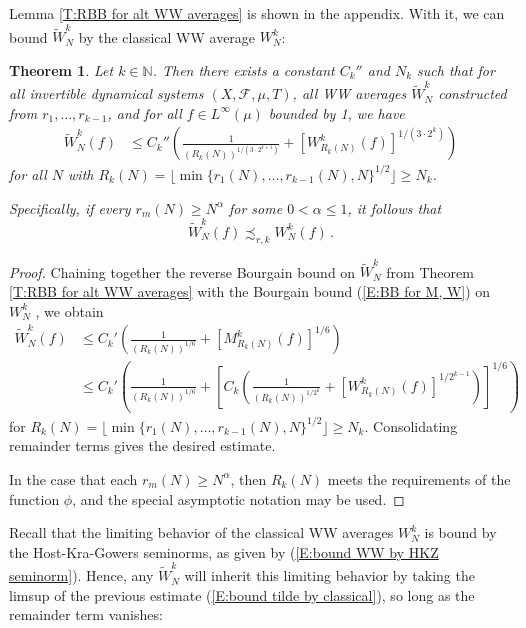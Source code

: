 \documentclass[11pt, oneside]{amsart}   	%
\newcommand{\1}{\mathbbm{1}}
\newcommand{\N}{\mathbb{N}}
\newcommand{\floor}[1]{\lfloor#1\rfloor}
\newtheorem{theorem}{Theorem}[section]
\theoremstyle{definition}
\begin{document}
Lemma \ref{T:RBB for alt WW averages} is shown in the appendix. With it, we can bound $\widetilde W_{N}^k$ by the classical WW average $W_N^k$:

\begin{theorem}\label{T:bound tilde by classical}
Let $k\in \N$. Then there exists a constant $C_k''$ and $N_k$ such that for all invertible dynamical systems $(X, \mathcal{F},\mu, T)$, all WW averages $\widetilde W_N^k$ constructed from $r_1, \dots, r_{k-1}$, and for all $f\in L^\infty(\mu)$ bounded by 1, we have
\begin{align}\label{E:bound tilde by classical}
\widetilde W_N^k(f) &\leq C_k'' \left( \frac{1}{(R_k(N))^{1/(3\cdot 2^{k+1})}} + \left[W_{R_k(N)}^k (f)\right]^{1/(3\cdot 2^{k})} \right)
\end{align}
for all $N$ with $R_k(N) = \floor{\min\{r_1(N), \dots, r_{k-1}(N), N\}^{1/2}} \geq N_k$.

Specifically, if every $r_m(N) \geq N^\alpha$ for some $0< \alpha \leq 1$, it follows that
$$\widetilde{W}_N^k(f) \precsim_{r, k} W_N^k(f)\, .$$
\end{theorem}
\begin{proof}
Chaining together the reverse Bourgain bound on $\widetilde W_N^k$ from Theorem \ref{T:RBB for alt WW averages} with the Bourgain bound (\ref{E:BB for M, W}) on $W_N^k$ , we obtain
\begin{align*}
\widetilde W_N^k(f) &\leq C_k'\left( \frac{1}{(R_k(N))^{1/6}} + \left[ M_{R_k(N)}^k (f)\right]^{1/6}\right) \\
&\leq C_k'\left( \frac{1}{(R_k(N))^{1/6}} + \left[  C_{k} \left( \frac{1}{(R_k(N))^{1/2^k}} + \left[W_{R_k(N)}^k (f)\right]^{1/2^{k-1}} \right)\right]^{1/6}\right)
\end{align*}
for $R_k(N) = \floor{\min\{r_1(N), \dots, r_{k-1}(N), N\}^{1/2}} \geq N_k$. Consolidating remainder terms gives the desired estimate.

In the case that each $r_m(N) \geq N^\alpha$, then $R_k(N)$ meets the requirements of the function $\phi$, and the special asymptotic notation may be used.
\end{proof}
Recall that the limiting behavior of the classical WW averages $W_N^k$ is bound by the Host-Kra-Gowers seminorms, as given by (\ref{E:bound WW by HKZ seminorm}). Hence, any $\widetilde W_N^k$ will inherit this limiting behavior by taking the limsup of the previous estimate (\ref{E:bound tilde by classical}), so long as the remainder term vanishes:
\end{document}
